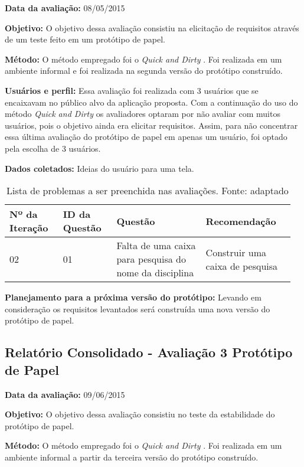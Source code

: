 \textbf{Data da avaliação:} 08/05/2015

\textbf{Objetivo:}
O objetivo dessa avaliação consistiu na elicitação de requisitos através de um teste feito em um protótipo de papel.

\textbf{Método:}
O método empregado foi o \textit{Quick and Dirty} \cite{preece}. Foi realizada em um ambiente informal e foi realizada na segunda versão do protótipo construído.

\textbf{Usuários e perfil:}
Essa avaliação foi realizada com 3 usuários que se encaixavam no público alvo da aplicação proposta. Com a continuação do uso do método \textit{Quick and Dirty} os avaliadores optaram por não avaliar com muitos usuários, pois o objetivo ainda era elicitar requisitos. Assim, para não concentrar essa última avaliação do protótipo de papel em apenas um usuário, foi optado pela escolha de 3 usuários.

\textbf{Dados coletados:}
Ideias do usuário para uma tela.

\begin{table*}[!h]
\caption{Lista de problemas a ser preenchida nas avaliações. Fonte: \cite{preece} adaptado}
\label{tab:problema}
  \begin{tabular}{p{0.18\linewidth}p{0.18\linewidth}p{0.30\linewidth}p{0.30\linewidth}}
  \hline
    Nº da Iteração & ID da Questão & Questão & Recomendação\\
 \hline
    02 & 01 & Falta de uma caixa para pesquisa do nome da disciplina & Construir uma caixa de pesquisa\\
  \end{tabular}
\end{table*}

\textbf{Planejamento para a próxima versão do protótipo:}
Levando em consideração os requisitos levantados será construída uma nova versão do protótipo de papel.

\vfill
\pagebreak
\subsection{Relatório Consolidado - Avaliação 3 Protótipo de Papel}

\textbf{Data da avaliação:} 09/06/2015

\textbf{Objetivo:}
O objetivo dessa avaliação consistiu no teste da estabilidade do protótipo de papel.

\textbf{Método:}
O método empregado foi o \textit{Quick and Dirty} \cite{preece}. Foi realizada em um ambiente informal a partir da terceira versão do protótipo construído.

